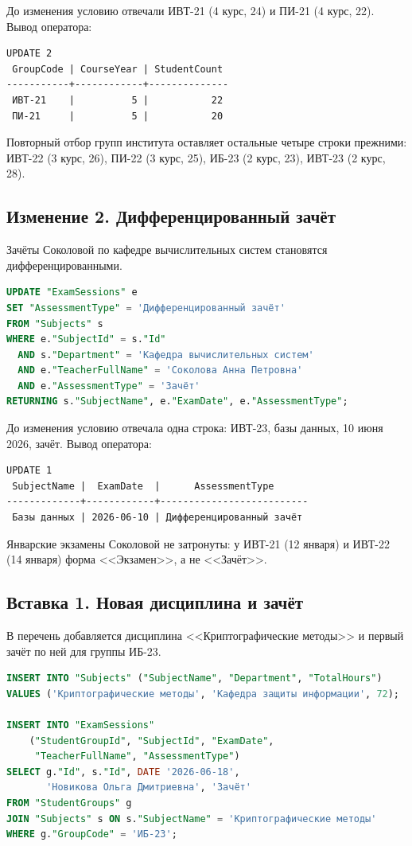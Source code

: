 \documentclass[12pt,a4paper]{article}
\begin{document}
До изменения условию отвечали ИВТ-21 (4 курс, 24) и ПИ-21 (4 курс, 22). Вывод оператора:

\begin{lstlisting}
UPDATE 2
 GroupCode | CourseYear | StudentCount
-----------+------------+--------------
 ИВТ-21    |          5 |           22
 ПИ-21     |          5 |           20
\end{lstlisting}

Повторный отбор групп института оставляет остальные четыре строки прежними: ИВТ-22 (3 курс, 26), ПИ-22 (3 курс, 25), ИБ-23 (2 курс, 23), ИВТ-23 (2 курс, 28).

\subsection*{Изменение 2. Дифференцированный зачёт}
Зачёты Соколовой по кафедре вычислительных систем становятся дифференцированными.

\begin{lstlisting}[language=SQL]
UPDATE "ExamSessions" e
SET "AssessmentType" = 'Дифференцированный зачёт'
FROM "Subjects" s
WHERE e."SubjectId" = s."Id"
  AND s."Department" = 'Кафедра вычислительных систем'
  AND e."TeacherFullName" = 'Соколова Анна Петровна'
  AND e."AssessmentType" = 'Зачёт'
RETURNING s."SubjectName", e."ExamDate", e."AssessmentType";
\end{lstlisting}

До изменения условию отвечала одна строка: ИВТ-23, базы данных, 10 июня 2026, зачёт. Вывод оператора:

\begin{lstlisting}
UPDATE 1
 SubjectName |  ExamDate  |      AssessmentType
-------------+------------+--------------------------
 Базы данных | 2026-06-10 | Дифференцированный зачёт
\end{lstlisting}

Январские экзамены Соколовой не затронуты: у ИВТ-21 (12 января) и ИВТ-22 (14 января) форма <<Экзамен>>, а не <<Зачёт>>.
\subsection*{Вставка 1. Новая дисциплина и зачёт}
В перечень добавляется дисциплина <<Криптографические методы>> и первый зачёт по ней для группы ИБ-23.

\begin{lstlisting}[language=SQL]
INSERT INTO "Subjects" ("SubjectName", "Department", "TotalHours")
VALUES ('Криптографические методы', 'Кафедра защиты информации', 72);

INSERT INTO "ExamSessions"
    ("StudentGroupId", "SubjectId", "ExamDate",
     "TeacherFullName", "AssessmentType")
SELECT g."Id", s."Id", DATE '2026-06-18',
       'Новикова Ольга Дмитриевна', 'Зачёт'
FROM "StudentGroups" g
JOIN "Subjects" s ON s."SubjectName" = 'Криптографические методы'
WHERE g."GroupCode" = 'ИБ-23';
\end{lstlisting}
\end{document}
